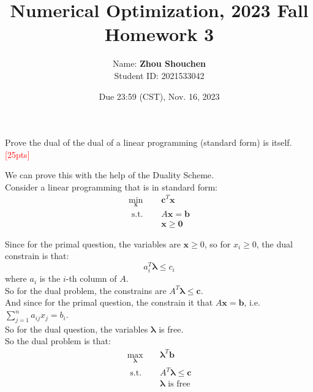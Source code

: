 \documentclass[10pt]{article}
\newenvironment{problem}[2][Problem]{\begin{trivlist}
\item[\hskip \labelsep {\bfseries #1}\hskip \labelsep {\bfseries #2.}]}{\end{trivlist}}
\begin{document}
\title{	Numerical Optimization, 2023 Fall\\Homework 3}
\date{Due 23:59 (CST), Nov. 16, 2023 }

\author{
    Name: \textbf{Zhou Shouchen} \\
	Student ID: 2021533042
}

\maketitle
\newpage


\begin{problem}{1}
    Prove the dual of the dual of a linear programming (standard form) is itself.\textcolor{red}{[25pts]}
\end{problem}
We can prove this with the help of the Duality Scheme.\\
Consider a linear programming that is in standard form:\\
\begin{equation}
\begin{aligned}
\min_{\bm{x}} \quad & \bm{c}^T\bm{x} \\
\text { s.t. } \quad & A\bm{x} = \bm{b} \\
& \bm{x} \geq \bm{0}
\end{aligned}
\end{equation}

Since for the primal question, the variables are $\bm{x}\geq 0$, so for $x_i\geq 0$, the dual constrain is that:\\
$$a_i^T\bm{\lambda} \leq c_i$$
where $a_i$ is the $i$-th column of $A$.\\

So for the dual problem, the constrains are $A^T\bm{\lambda} \leq \bm{c}$.\\

And since for the primal question, the constrain it that $A\bm{x} = \bm{b}$, i.e.$\sum\limits_{j=1}^na_{ij}x_j=b_i$.\\
So for the dual question, the variables $\bm{\lambda}$ is free.\\

So the dual problem is that:\\
\begin{equation}
\begin{aligned}
\max_{\bm{\lambda}} \quad & \bm{\lambda}^T\bm{b} \\
\text { s.t. } \quad & A^T\bm{\lambda} \leq \bm{c} \\
& \bm{\lambda} \text{ is free}
\end{aligned}
\end{equation}
\end{document}
